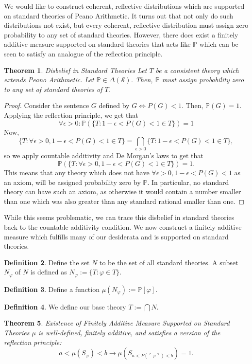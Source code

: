 \documentclass[12pt]{article}
\newcommand{\PP}{\mathbb{P}}
\newcommand{\vp}{\varphi}
\newcommand{\coh}{coherent}
\theoremstyle{plain}
\newtheorem{theorem}{Theorem}[subsection]
\theoremstyle{definition}
\newtheorem{definition}[theorem]{Definition}
\theoremstyle{remark}
\begin{document}
We would like to construct \coh, reflective distributions which are supported on standard theories of Peano Arithmetic. It turns out that not only do such distributions not exist, but every \coh, reflective distribution must assign zero probability to any set of standard theories. However, there does exist a finitely additive measure supported on standard theories that acts like $\PP$ which can be seen to satisfy an analogue of the reflection principle.
\begin{theorem} \emph{Disbelief in Standard Theories}
Let $T$ be a consistent theory which extends Peano Arithmetic.
Let $\PP\in\Delta(\mathcal{S})$.
Then, $\PP$ must assign probability zero to any set of standard theories of $T$.
\end{theorem}
\begin{proof}
Consider the sentence $G$ defined by $G \iff P(G) < 1$.
Then, $\PP(G)=1$.
Applying the reflection principle, we get that 
$$\forall\epsilon>0: \PP(\{T:1-\epsilon<P(G)<1\in T\})=1$$
Now, 
$$\{T:\forall \epsilon>0,1-\epsilon<P(G)<1\in T\}=\bigcap_{\epsilon>0}\{T:1-\epsilon<P(G)<1\in T\},$$ so we apply countable additivity and De Morgan's laws to get that $$\PP(\{T:\forall \epsilon>0,1-\epsilon<P(G)<1\in T\})=1.$$
This means that any theory which does not have $\forall \epsilon>0,1-\epsilon<P(G)<1$ as an axiom, will be assigned probability zero by $\PP$.
In particular, no standard theory can have such an axiom, as otherwise it would contain a number smaller than one which was also greater than any standard rational smaller than one.
\end{proof}
While this seems problematic, we can trace this disbelief in standard theories back to the countable additivity condition. We now construct a finitely additive measure which fulfills many of our desiderata and is supported on standard theories.
\begin{definition}
Define the set $N$ to be the set of all standard theories. A subset $N_{\vp}$ of $N$ is defined as $N_{\vp}:=\{T:\vp\in T\}$.
\end{definition}
\begin{definition}
Define a function $\mu(N_{\vp}):=\PP[\vp]$.
\end{definition}
\begin{definition}
We define our base theory $T:=\bigcap N$.
\end{definition}
\begin{theorem} \emph{Existence of Finitely Additive Measure Supported on Standard Theories}
$\mu$ is well-defined, finitely additive, and satisfies a version of the reflection principle:
$$a < \mu(S_{\vp}) < b \rightarrow \mu(S_{a < P(\ulcorner \vp \urcorner) < b}) = 1.$$
\end{theorem}
\end{document}
